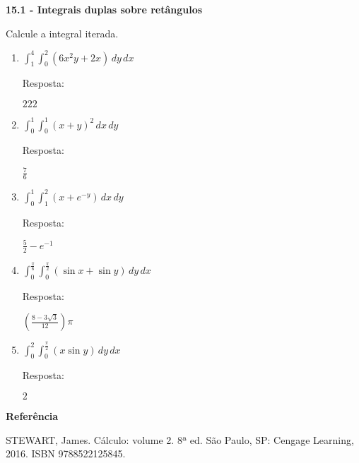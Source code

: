 \documentclass[a4paper, 12pt]{article}
\newcommand{\resposta}[1]{\hfill{{\begin{scriptsize} Resposta: \end{scriptsize}} #1}}
\begin{document}
	\thispagestyle{empty}

	\begin{large} 
	\begin{center}		
		\textbf{15.1 - Integrais duplas sobre retângulos}		
	\end{center}
	\end{large} 
	
	\vspace{5mm}
	
	Calcule a integral iterada.
	
	\begin{enumerate} %
		
		\item $\displaystyle \int_{1}^{4} \int_{0}^{2} (6x^{2}y + 2x) \, dy \, dx$ 
		\resposta{$222$}
		
		\item $\displaystyle \int_{0}^{1} \int_{0}^{1} (x + y)^2 \, dx \, dy$ 
		\resposta{$\frac{7}{6}$}
		
		\item $\displaystyle \int_{0}^{1} \int_{1}^{2} (x + e^{-y}) \, dx \, dy$ 
		\resposta{$\frac{5}{2} - e^{-1}$}
		
		\item $\displaystyle \int_{0}^{\frac{\pi}{6}} \int_{0}^{\frac{\pi}{2}} (\sin x + \sin y) \, dy \, dx$ 
		\resposta{$(\frac{8 - 3\sqrt{3}}{12})\pi$}
		
		\item $\displaystyle \int_{0}^{2} \int_{0}^{\frac{\pi}{2}} (x \sin y) \, dy \, dx$ 
		\resposta{$2$}
		
	\end{enumerate}
		
	\vspace{5mm}	
	
	\textbf{Referência}	
	
	\begin{footnotesize}
		STEWART, James. Cálculo: volume 2. 8ª ed. São Paulo, SP: Cengage Learning, 2016.	ISBN 9788522125845.
	\end{footnotesize}
\end{document}
